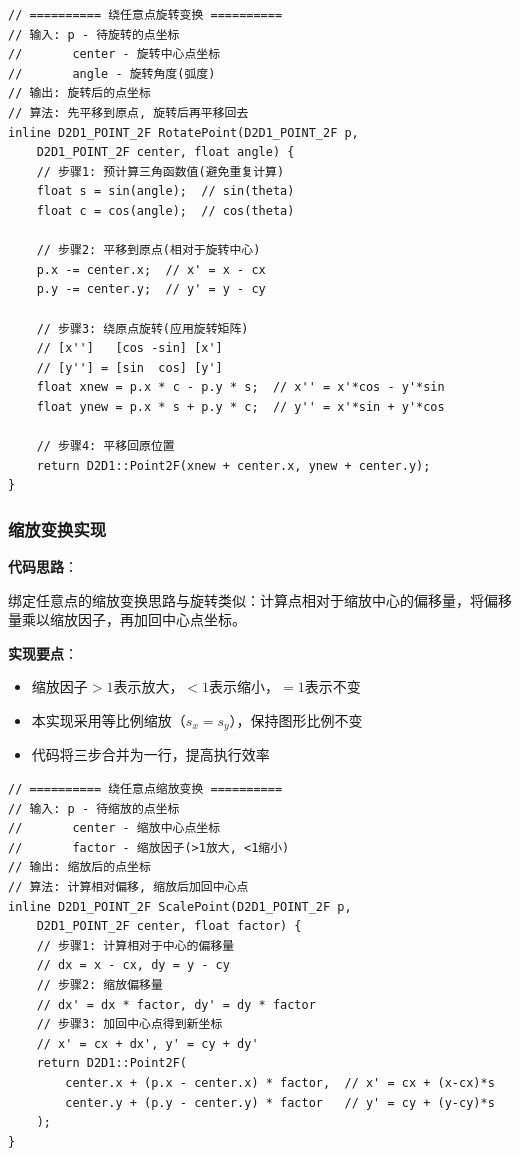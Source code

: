 \documentclass[12pt,a4paper]{article}
\begin{document}
\begin{tcolorbox}
\begin{lstlisting}[caption={旋转变换函数}]
// ========== 绕任意点旋转变换 ==========
// 输入: p - 待旋转的点坐标
//       center - 旋转中心点坐标
//       angle - 旋转角度(弧度)
// 输出: 旋转后的点坐标
// 算法: 先平移到原点, 旋转后再平移回去
inline D2D1_POINT_2F RotatePoint(D2D1_POINT_2F p, 
    D2D1_POINT_2F center, float angle) {
    // 步骤1: 预计算三角函数值(避免重复计算)
    float s = sin(angle);  // sin(theta)
    float c = cos(angle);  // cos(theta)
    
    // 步骤2: 平移到原点(相对于旋转中心)
    p.x -= center.x;  // x' = x - cx
    p.y -= center.y;  // y' = y - cy
    
    // 步骤3: 绕原点旋转(应用旋转矩阵)
    // [x'']   [cos -sin] [x']
    // [y''] = [sin  cos] [y']
    float xnew = p.x * c - p.y * s;  // x'' = x'*cos - y'*sin
    float ynew = p.x * s + p.y * c;  // y'' = x'*sin + y'*cos
    
    // 步骤4: 平移回原位置
    return D2D1::Point2F(xnew + center.x, ynew + center.y);
}
\end{lstlisting}

\subsubsection{缩放变换实现}

\textbf{代码思路}：

绑定任意点的缩放变换思路与旋转类似：计算点相对于缩放中心的偏移量，将偏移量乘以缩放因子，再加回中心点坐标。

\textbf{实现要点}：
\begin{itemize}
    \item 缩放因子$>1$表示放大，$<1$表示缩小，$=1$表示不变
    \item 本实现采用等比例缩放（$s_x = s_y$），保持图形比例不变
    \item 代码将三步合并为一行，提高执行效率
\end{itemize}

\begin{lstlisting}[caption={缩放变换函数}]
// ========== 绕任意点缩放变换 ==========
// 输入: p - 待缩放的点坐标
//       center - 缩放中心点坐标
//       factor - 缩放因子(>1放大, <1缩小)
// 输出: 缩放后的点坐标
// 算法: 计算相对偏移, 缩放后加回中心点
inline D2D1_POINT_2F ScalePoint(D2D1_POINT_2F p, 
    D2D1_POINT_2F center, float factor) {
    // 步骤1: 计算相对于中心的偏移量
    // dx = x - cx, dy = y - cy
    // 步骤2: 缩放偏移量
    // dx' = dx * factor, dy' = dy * factor
    // 步骤3: 加回中心点得到新坐标
    // x' = cx + dx', y' = cy + dy'
    return D2D1::Point2F(
        center.x + (p.x - center.x) * factor,  // x' = cx + (x-cx)*s
        center.y + (p.y - center.y) * factor   // y' = cy + (y-cy)*s
    );
}
\end{lstlisting}


\end{tcolorbox}
\end{document}
